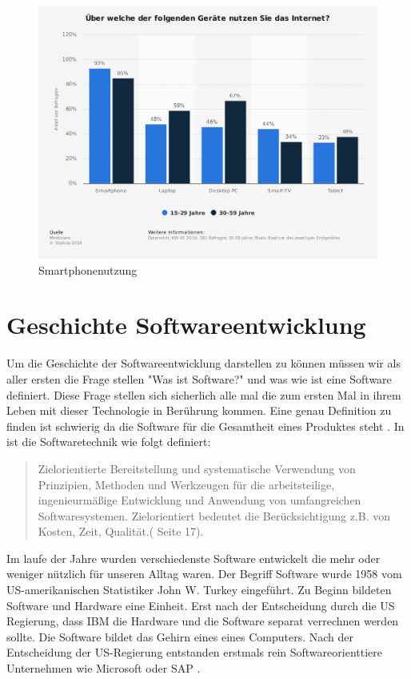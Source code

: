 \begin{figure}[h]
	\centering
	\includegraphics[width=14cm]{BilderAllgemein/SmartPhoneNutzung}\medskip
	\caption{Smartphonenutzung \cite{Geraetenutzung}}
	\label{fig:Smartphonenutzung}
\end{figure}







\section{Geschichte Softwareentwicklung}
Um die Geschichte der Softwareentwicklung darstellen zu können müssen wir als aller ersten die Frage stellen "Was ist Software?" und was wie ist eine Software definiert.
Diese Frage stellen sich sicherlich alle mal die zum ersten Mal in ihrem Leben mit dieser Technologie in Berührung kommen. Eine genau Definition zu finden ist schwierig da die Software für die Gesamtheit eines Produktes steht . In \cite{WasistSoftware} ist die Softwaretechnik wie folgt definiert:
\begin{quote}
\glqq Zielorientierte Bereitstellung und systematische Verwendung von Prinzipien, Methoden und Werkzeugen für
die arbeitsteilige, ingenieurmäßige Entwicklung und Anwendung
von umfangreichen Softwaresystemen. Zielorientiert bedeutet die
Berücksichtigung z.B. von Kosten, Zeit, Qualität.\grqq (\cite{WasistSoftware} Seite 17).
\end{quote}
Im laufe der Jahre wurden verschiedenste Software entwickelt die mehr oder weniger nützlich für unseren Alltag waren.
Der Begriff Software wurde 1958 vom US-amerikanischen Statistiker John W. Turkey eingeführt.
Zu Beginn bildeten Software und Hardware eine Einheit. Erst nach der Entscheidung durch die US Regierung, dass IBM die Hardware und die Software separat verrechnen werden sollte.
Die Software bildet das Gehirn eines eines Computers. 
Nach der Entscheidung der US-Regierung entstanden erstmals rein Softwareorienttiere Unternehmen wie Microsoft oder SAP \cite{Microsoft} \cite{SAP}. 


